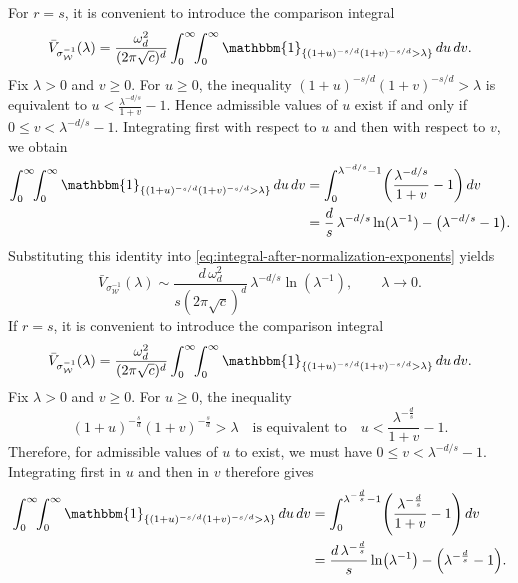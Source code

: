 \documentclass[a4paper,12pt]{article}
\let\originalleft\left
\let\originalright\right
\renewcommand{\left}{\mathopen{}\mathclose\bgroup\originalleft}
\renewcommand{\right}{\aftergroup\egroup\originalright}
\newcommand{\symbolnotsobw}{\symbolnot_{\mathcal{W}}}
\newcommand{\symbolnot}{\sigma}
\begin{document}
\iffalse
For $r=s$, it is convenient to introduce the comparison integral
\begin{equation}\label{eq:integral-after-normalization-exponents}
\bar V_{\symbolnotsobw^{-1}}(\lambda)
=
\frac{\omega_d^2}{(2\pi\sqrt{c})^{d}}
\int_0^\infty\!\!\int_0^\infty
\mathbbm{1}_{\{(1+u)^{-s/d}(1+v)^{-s/d}>\lambda\}}
\,du\,dv .
\end{equation}
Fix $\lambda>0$ and $v\ge0$. For $u\ge0$, the inequality
$(1+u)^{-s/d}(1+v)^{-s/d}>\lambda$ is equivalent to
$u<\frac{\lambda^{-d/s}}{1+v}-1$.
Hence admissible values of $u$ exist if and only if
$0\le v<\lambda^{-d/s}-1$. 
Integrating first with respect to $u$ and then with respect to $v$, we obtain
\begin{align*}
\int_0^\infty\!\!\int_0^\infty
\mathbbm{1}_{\{(1+u)^{-s/d}(1+v)^{-s/d}>\lambda\}}
\,du\,dv
&=
\int_0^{\lambda^{-d/s}-1}
\left(\frac{\lambda^{-d/s}}{1+v}-1\right)\,dv \\
&=
\frac{d}{s}\,\lambda^{-d/s}\ln(\lambda^{-1})
-
\bigl(\lambda^{-d/s}-1\bigr).
\end{align*}
Substituting this identity into \eqref{eq:integral-after-normalization-exponents}
yields
\begin{equation}\label{eq:vbar-asymp1}
\bar V_{\symbolnotsobw^{-1}}(\lambda)
\sim
\frac{d\,\omega_d^2}{s(2\pi\sqrt{c})^{d}}
\,\lambda^{-d/s}\ln(\lambda^{-1}),
\qquad \lambda\to0.
\end{equation}
\iffalse 
If $r=s$, it is convenient
to introduce the comparison integral
\begin{equation}\label{eq:integral-after-normalization-exponents}
\bar V_{\symbolnotsobw^{-1}}(\lambda)
=
\frac{\omega_d^2}{(2\pi\sqrt{c})^{d}}
\int_0^\infty\!\!\int_0^\infty
\mathbbm{1}_{\{(1+u)^{-s/d}(1+v)^{-s/d}>\lambda\}}
\,du\,dv.
\end{equation}
Fix $\lambda>0$ and $v\ge0$. For $u\ge0$, the inequality
\[
(1+u)^{-\frac{s}{d}}(1+v)^{-\frac{s}{d}}>\lambda
\quad \text{is equivalent to} \quad 
u<\frac{\lambda^{-\frac{d}{s}}}{1+v}-1.
\]
Therefore, for admissible values of $u$ to exist, we must have
$0 \le v < \lambda^{-d/s}-1$.
Integrating first in $u$ and then in $v$ therefore gives
\begin{align*}
    \int_0^\infty\!\!\int_0^\infty
\mathbbm{1}_{\{(1+u)^{-s/d}(1+v)^{-s/d}>\lambda\}}
\,du\,dv
&=
\int_0^{\lambda^{-\frac{d}{s}}-1}
\left(\frac{\lambda^{-\frac{d}{s}}}{1+v}-1\right)\,dv \\
&= \frac{d\,\lambda^{-\frac{d}{s}} }{s} \ln\left(\lambda^{-1}\right)
- \left(\lambda^{-\frac{d}{s}}-1\right).
\end{align*}
\end{document}
